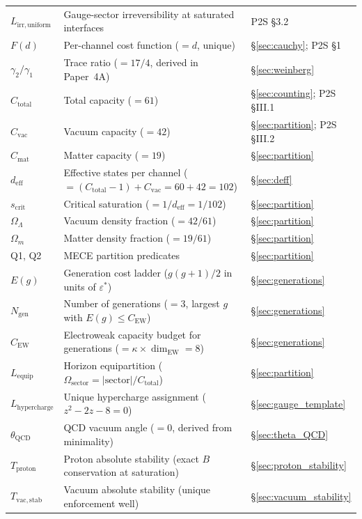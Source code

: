 \documentclass[11pt]{article}
\begin{document}
\begin{center}
\begin{tabular}{lp{8.5cm}l}
$L_{\mathrm{irr,uniform}}$ & Gauge-sector irreversibility at saturated interfaces & P2S \S3.2 \\
$F(d)$ & Per-channel cost function ($= d$, unique) & \S\ref{sec:cauchy}; P2S \S1 \\
$\gamma_2/\gamma_1$ & Trace ratio ($= 17/4$, derived in Paper~4A) & \S\ref{sec:weinberg} \\
$C_{\mathrm{total}}$ & Total capacity ($= 61$) & \S\ref{sec:counting}; P2S \S III.1 \\
$C_{\mathrm{vac}}$ & Vacuum capacity ($= 42$) & \S\ref{sec:partition}; P2S \S III.2 \\
$C_{\mathrm{mat}}$ & Matter capacity ($= 19$) & \S\ref{sec:partition} \\
$d_{\mathrm{eff}}$ & Effective states per channel ($= (C_{\mathrm{total}}-1) + C_{\mathrm{vac}} = 60 + 42 = 102$) & \S\ref{sec:deff} \\
$s_{\mathrm{crit}}$ & Critical saturation ($= 1/d_{\mathrm{eff}} = 1/102$) & \S\ref{sec:partition} \\
$\Omega_\Lambda$ & Vacuum density fraction ($= 42/61$) & \S\ref{sec:partition} \\
$\Omega_m$ & Matter density fraction ($= 19/61$) & \S\ref{sec:partition} \\
Q1, Q2 & MECE partition predicates & \S\ref{sec:partition} \\
$E(g)$ & Generation cost ladder ($g(g+1)/2$ in units of $\varepsilon^*$) & \S\ref{sec:generations} \\
$N_{\mathrm{gen}}$ & Number of generations ($= 3$, largest $g$ with $E(g) \le C_{\mathrm{EW}}$) & \S\ref{sec:generations} \\
$C_{\mathrm{EW}}$ & Electroweak capacity budget for generations ($= \kappa \times \dim_{\mathrm{EW}} = 8$) & \S\ref{sec:generations} \\
$L_{\mathrm{equip}}$ & Horizon equipartition ($\Omega_{\mathrm{sector}} = |\mathrm{sector}|/C_{\mathrm{total}}$) & \S\ref{sec:partition} \\
$L_{\mathrm{hypercharge}}$ & Unique hypercharge assignment ($z^2 - 2z - 8 = 0$) & \S\ref{sec:gauge_template} \\
$\theta_{\mathrm{QCD}}$ & QCD vacuum angle ($= 0$, derived from minimality) & \S\ref{sec:theta_QCD} \\
$T_{\mathrm{proton}}$ & Proton absolute stability (exact $B$ conservation at saturation) & \S\ref{sec:proton_stability} \\
$T_{\mathrm{vac,stab}}$ & Vacuum absolute stability (unique enforcement well) & \S\ref{sec:vacuum_stability} \\
\bottomrule
\end{tabular}
\end{center}
\end{document}
